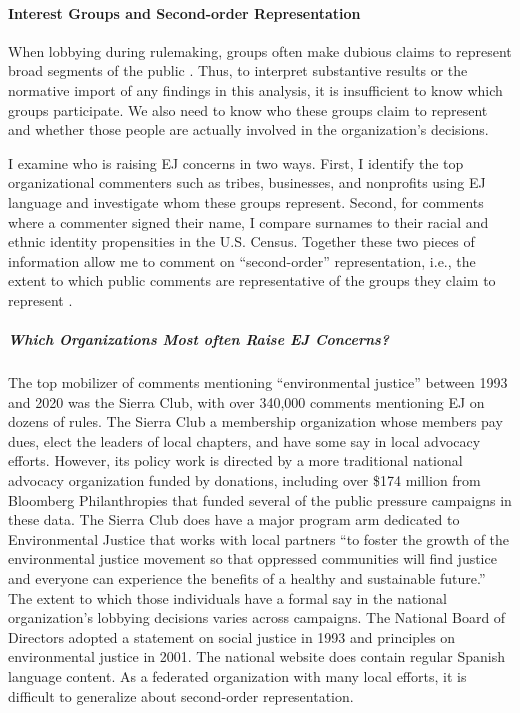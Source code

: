 \documentclass[
      12pt,
        ]{article}
\begin{document}
\hypertarget{interest-groups-and-second-order-representation}{%
\paragraph{Interest Groups and Second-order Representation}\label{interest-groups-and-second-order-representation}}

When lobbying during rulemaking, groups often
make dubious claims to represent broad segments of the public \citep{Seifter2016UCLA}. Thus, to interpret substantive results or the normative import of any findings in this analysis, it is insufficient to know which groups participate. We
also need to know who these groups claim to represent and whether those people are actually involved in the organization's decisions.

I examine who is raising EJ concerns in two ways.
First, I identify the top organizational commenters such as tribes,
businesses, and nonprofits using EJ language
and investigate whom these groups represent. Second, for comments where a
commenter signed their name, I compare surnames to their racial and ethnic identity propensities in the U.S. Census. Together these
two pieces of information allow me to comment on ``second-order'' representation, i.e., the extent to which public comments are
representative of the groups they claim to represent \citep{Seifter2016UCLA}.

\hypertarget{which-organizations-most-often-raise-ej-concerns}{%
\subparagraph{Which Organizations Most often Raise EJ Concerns?}\label{which-organizations-most-often-raise-ej-concerns}}

The top mobilizer of comments mentioning ``environmental justice'' between 1993 and 2020 was the Sierra Club, with over 340,000 comments mentioning EJ on dozens of rules. The Sierra Club a membership organization whose members pay dues, elect the leaders of local chapters, and have some say in local advocacy efforts. However, its policy work is directed by a more traditional national advocacy organization funded by donations, including over \$174 million from Bloomberg Philanthropies that funded several of the public pressure campaigns in these data. The Sierra Club does have a major program arm dedicated to Environmental Justice that works with local partners ``to foster the growth of the environmental justice movement so that oppressed communities will find justice and everyone can experience the benefits of a healthy and sustainable future.'' The extent to which those individuals have a formal say in the national organization's lobbying decisions varies across campaigns. The National Board of Directors adopted a statement on social justice in 1993 and principles on environmental justice in 2001. The national website does contain regular Spanish language content. As a federated organization with many local efforts, it is difficult to generalize about second-order representation.
\end{document}
